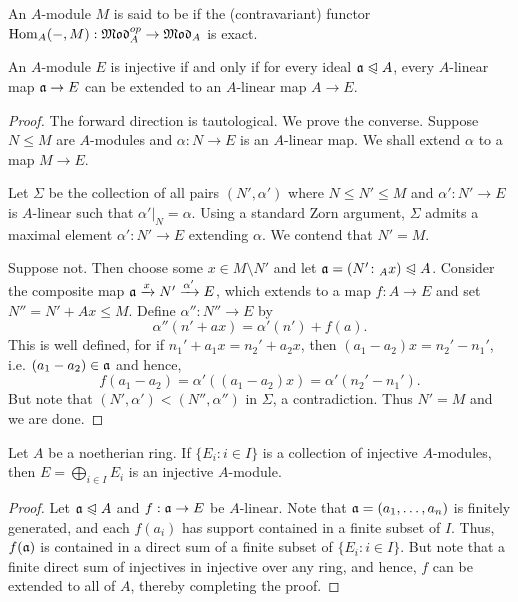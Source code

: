 \begin{definition}
    An $A$-module $M$ is said to be  if the (contravariant) functor $\operatorname{Hom}_A(-,M):\mathfrak{Mod}_A^{op}\to\mathfrak{Mod}_A$ is exact.
\end{definition}

\begin{theorem}
    An $A$-module $E$ is injective if and only if for every ideal $\mathfrak{a}\trianglelefteqslant A$, every $A$-linear map $\mathfrak{a}\to E$ can be extended to an $A$-linear map $A\to E$.
\end{theorem}
\begin{proof}
    The forward direction is tautological. We prove the converse. Suppose $N\le M$ are $A$-modules and $\alpha: N\to E$ is an $A$-linear map. We shall extend $\alpha$ to a map $M\to E$.

    Let $\Sigma$ be the collection of all pairs $(N',\alpha')$ where $N\le N'\le M$ and $\alpha': N'\to E$ is $A$-linear such that $\alpha'|_N = \alpha$. Using a standard Zorn argument, $\Sigma$ admits a maximal element $\alpha': N'\to E$ extending $\alpha$. We contend that $N' = M$.

    Suppose not. Then choose some $x\in M\setminus N'$ and let $\mathfrak{a} = (N'\colon_A x)\trianglelefteqslant A$. Consider the composite map $\mathfrak{a}\xrightarrow{x} N'\xrightarrow{\alpha'} E$, which extends to a map $f: A\to E$ and set $N'' = N' + Ax\le M$. Define $\alpha'': N''\to E$ by 
    \begin{equation*}
        \alpha''(n' + ax) = \alpha'(n') + f(a).
    \end{equation*}
    This is well defined, for if $n_1' + a_1 x = n_2' + a_2 x$, then $(a_1 - a_2)x = n_2' - n_1'$, i.e. $(a_1 - a_2)\in\mathfrak{a}$ and hence, 
    \begin{equation*}
        f(a_1 - a_2) = \alpha'((a_1 - a_2)x) = \alpha'(n_2' - n_1').
    \end{equation*}
    But note that $(N', \alpha') < (N'', \alpha'')$ in $\Sigma$, a contradiction. Thus $N' = M$ and we are done.
\end{proof}

\begin{corollary}
    Let $A$ be a noetherian ring. If $\{E_i\colon i\in I\}$ is a collection of injective $A$-modules, then $E = \displaystyle\bigoplus_{i\in I} E_i$ is an injective $A$-module.
\end{corollary}
\begin{proof}
    Let $\mathfrak{a}\trianglelefteqslant A$ and $f: \mathfrak{a}\to E$ be $A$-linear. Note that $\mathfrak{a} = (a_1,\dots,a_n)$ is finitely generated, and each $f(a_i)$ has support contained in a finite subset of $I$. Thus, $f(\mathfrak{a})$ is contained in a direct sum of a finite subset of $\{E_i\colon i\in I\}$. But note that a finite direct sum of injectives in injective over any ring, and hence, $f$ can be extended to all of $A$, thereby completing the proof.
\end{proof}

